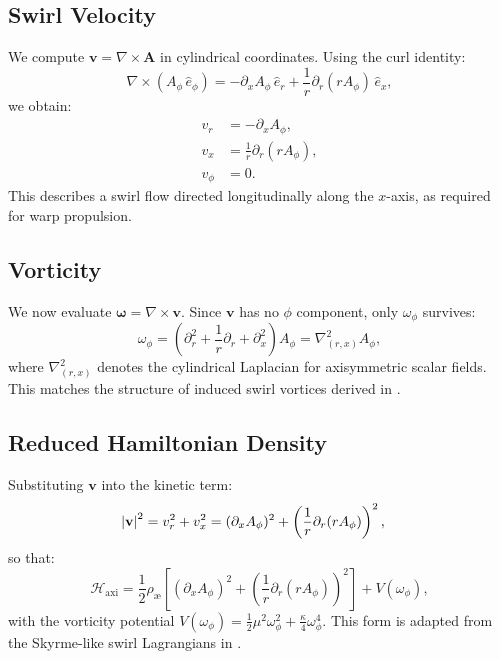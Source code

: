 \documentclass[preprint,notitlepage]{revtex4-2}
\begin{document}
        \subsection*{Swirl Velocity}
        We compute $\mathbf{v} = \nabla \times \mathbf{A}$ in cylindrical coordinates. Using the curl identity:
        \begin{equation}
          \nabla \times (A_\phi\, \hat{e}_\phi) = -\partial_x A_\phi \, \hat{e}_r + \frac{1}{r} \partial_r(r A_\phi) \, \hat{e}_x,
        \end{equation}
        we obtain:
        \begin{align}
          v_r &= -\partial_x A_\phi, \\
          v_x &= \frac{1}{r} \partial_r(r A_\phi), \\
          v_\phi &= 0.
        \end{align}
        This describes a swirl flow directed longitudinally along the $x$-axis, as required for warp propulsion.

        \subsection*{Vorticity}
        We now evaluate $\boldsymbol{\omega} = \nabla \times \mathbf{v}$. Since $\mathbf{v}$ has no $\phi$ component, only $\omega_\phi$ survives:
        \begin{equation}
          \omega_\phi = (\partial_r^2 + \frac{1}{r}\partial_r + \partial_x^2) A_\phi = \nabla^2_{(r,x)} A_\phi,
        \end{equation}
        where $\nabla^2_{(r,x)}$ denotes the cylindrical Laplacian for axisymmetric scalar fields. This matches the structure of induced swirl vortices derived in \cite{VAM4, VAM10}.

        \subsection*{Reduced Hamiltonian Density}
        Substituting $\mathbf{v}$ into the kinetic term:
        \begin{align}
          \abs{\mathbf{v}}^2 &= v_r^2 + v_x^2 = (\partial_x A_\phi)^2 + \left( \frac{1}{r} \partial_r (r A_\phi) \right)^2,
        \end{align}
        so that:
        \begin{equation}
          \mathcal{H}_{\text{axi}} = \frac{1}{2}\rho_{æ}\left[ (\partial_x A_\phi)^2 + \left( \frac{1}{r} \partial_r(r A_\phi) \right)^2 \right] + V(\omega_\phi),
        \end{equation}
        with the vorticity potential $V(\omega_\phi) = \frac{1}{2} \mu^2 \omega_\phi^2 + \frac{\kappa}{4} \omega_\phi^4$. This form is adapted from the Skyrme-like swirl Lagrangians in \cite{VAM2}.
\end{document}
